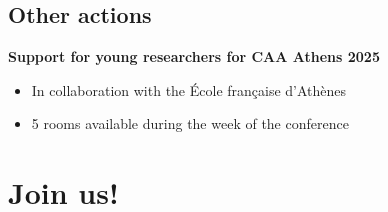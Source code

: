 \documentclass[xcolor=dvipsnames, 10pt, french, american]{beamer}
\begin{document}
\subsection{Other actions}
\frame{\tableofcontents[sectionstyle=show/shaded, subsectionstyle=show/shaded/hide]}
 
 
\begin{frame}
    \begin{block}{\textbf{Support for young researchers for CAA Athens 2025}}
       
        \begin{itemize}
            \item In collaboration with the École française d'Athènes
            \item 5 rooms available during the week of the conference 
        \end{itemize}
    \end{block}
\end{frame}



\section{Join us!}
\frame{\tableofcontents[sectionstyle=show/shaded, subsectionstyle=show/hide/hide]}
 
\end{document}
